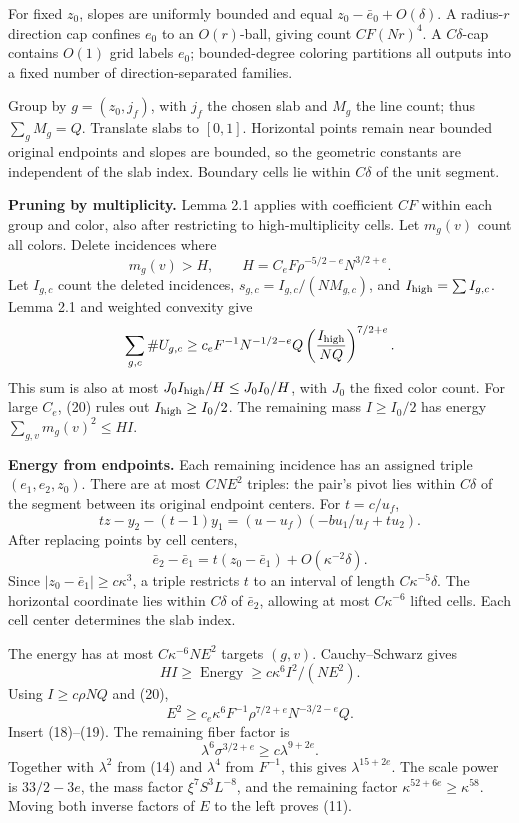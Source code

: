\documentclass[
  11pt,
  a4paper,
]{article}
\begin{document}
For fixed \(z_0\), slopes are uniformly bounded and equal
\(z_0-\bar e_0+O(\delta)\). A radius-\(r\) direction cap confines
\(e_0\) to an \(O(r)\)-ball, giving count \(CF(Nr)^4\). A
\(C\delta\)-cap contains \(O(1)\) grid labels \(e_0\); bounded-degree
coloring partitions all outputs into a fixed number of
direction-separated families.

Group by \(g=(z_0,j_f)\), with \(j_f\) the chosen slab and \(M_g\) the
line count; thus \(\sum_gM_g=Q\). Translate slabs to \([0,1]\).
Horizontal points remain near bounded original endpoints and slopes are
bounded, so the geometric constants are independent of the slab index.
Boundary cells lie within \(C\delta\) of the unit segment.

\textbf{Pruning by multiplicity.} Lemma 2.1 applies with coefficient
\(CF\) within each group and color, also after restricting to
high-multiplicity cells. Let \(m_g(v)\) count all colors. Delete
incidences where \[
 m_g(v)>H,\qquad
 H=C_eF\rho^{-5/2-e}N^{3/2+e}.
\tag{20}\label{eq:20}
\] Let \(I_{g,c}\) count the deleted incidences,
\(s_{g,c}=I_{g,c}/(NM_{g,c})\), and \(I_{\rm high}=\sum I_{g,c}\). Lemma
2.1 and weighted convexity give \[
 \sum_{g,c}\#U_{g,c}\ge
 c_eF^{-1}N^{-1/2-e}Q
       \left(\frac{I_{\rm high}}{NQ}\right)^{7/2+e}.
\] This sum is also at most \(J_0I_{\rm high}/H\le J_0I_0/H\), with
\(J_0\) the fixed color count. For large \(C_e\), (20) rules out
\(I_{\rm high}\ge I_0/2\). The remaining mass \(I\ge I_0/2\) has energy
\(\sum_{g,v}m_g(v)^2\le HI\).

\textbf{Energy from endpoints.} Each remaining incidence has an assigned
triple \((e_1,e_2,z_0)\). There are at most \(CNE^2\) triples: the
pair's pivot lies within \(C\delta\) of the segment between its original
endpoint centers. For \(t=c/u_f\), \[
 tz-y_2-(t-1)y_1
 =(u-u_f)(-b u_1/u_f+t u_2).
\] After replacing points by cell centers, \[
 \bar e_2-\bar e_1=t(z_0-\bar e_1)+O(\kappa^{-2}\delta).
\tag{21}\label{eq:21}
\] Since \(|z_0-\bar e_1|\ge c\kappa^3\), a triple restricts \(t\) to an
interval of length \(C\kappa^{-5}\delta\). The horizontal coordinate
lies within \(C\delta\) of \(\bar e_2\), allowing at most
\(C\kappa^{-6}\) lifted cells. Each cell center determines the slab
index.

The energy has at most \(C\kappa^{-6}NE^2\) targets \((g,v)\).
Cauchy--Schwarz gives \[
 HI\ge\operatorname{Energy}
 \ge c\kappa^6I^2/(NE^2).
\] Using \(I\ge c\rho NQ\) and (20), \[
 E^2\ge c_e\kappa^6F^{-1}
                \rho^{7/2+e}N^{-3/2-e}Q.
\tag{22}\label{eq:22}
\] Insert (18)--(19). The remaining fiber factor is \[
 \lambda^6\sigma^{3/2+e}
 \ge c\lambda^{9+2e}.
\] Together with \(\lambda^2\) from (14) and \(\lambda^4\) from
\(F^{-1}\), this gives \(\lambda^{15+2e}\). The scale power is
\(33/2-3e\), the mass factor \(\xi^7S^3L^{-8}\), and the remaining
factor \(\kappa^{52+6e}\ge\kappa^{58}\). Moving both inverse factors of
\(E\) to the left proves (11).
\end{document}
